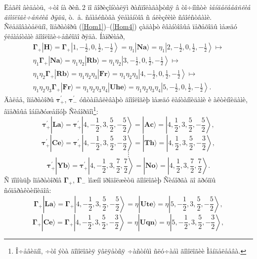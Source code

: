 Ëåãêî âèäåòü, ÷òî íà ðèñ.\,2 ïî ãîðèçîíòàëÿì ðàñïîëàãàþòñÿ â òî÷íîñòè \textit{ìåíäåëååâñêèå ãîìîëîãè÷åñêèå ðÿäû}, ò.~å. ñåìåéñòâà ýëåìåíòîâ ñ áëèçêèìè ñâîéñòâàìè. Ñëåäîâàòåëüíî, îïåðàòîðû (\ref{Hom1})--(\ref{Hom4}) çàäàþò êâàíòîâûå ïåðåõîäû ìåæäó ýëåìåíòàìè ãîìîëîãè÷åñêîãî ðÿäà. Íàïðèìåð,
\begin{multline}
\boldsymbol{\Gamma}_+|\textbf{H}\rangle=\boldsymbol{\Gamma}_+\left|1,-\frac{1}{2},0,\frac{1}{2},-\frac{1}{2}\right\rangle=
\eta_1|\textbf{Na}\rangle=\eta_1\left|2,-\frac{1}{2},0,\frac{1}{2},-\tfrac{1}{2}\right\rangle\longmapsto\\
\eta_1\boldsymbol{\Gamma}_+|\textbf{Na}\rangle=\eta_1\eta_2|\textbf{Rb}\rangle=\eta_1\eta_2
\left|3,-\frac{1}{2},0,\frac{1}{2},-\frac{1}{2}\right\rangle\longmapsto\\
\eta_1\eta_2\boldsymbol{\Gamma}_+|\textbf{Rb}\rangle=\eta_1\eta_2\eta_3|\textbf{Fr}\rangle=\eta_1\eta_2\eta_3
\left|4,-\frac{1}{2},0,\frac{1}{2},-\frac{1}{2}\right\rangle\longmapsto\\
\eta_1\eta_2\eta_3\boldsymbol{\Gamma}_+|\textbf{Fr}\rangle=\eta_1\eta_2\eta_3\eta_4|\textbf{Uhe}\rangle=\eta_1\eta_2\eta_3\eta_4
\left|5,-\frac{1}{2},0,\frac{1}{2},-\frac{1}{2}\right\rangle.\nonumber
\end{multline}
Äàëåå, îïåðàòîðû $\boldsymbol{\tau}^\prime_+$, $\boldsymbol{\tau}^\prime_-$ óñòàíàâëèâàþò ãîìîëîãèþ ìåæäó ëàíòàíîèäàìè è àêòèíîèäàìè, âïåðâûå îáíàðóæåííóþ Ñèáîðãîì\footnote{Î÷åâèäíî, ÷òî ýòà ãîìîëîãèÿ ÿâëÿåòñÿ ÷àñòíûì ñëó÷àåì ãîìîëîãèè Ìåíäåëååâà.}:
\[
\boldsymbol{\tau}^\prime_+|\textbf{La}\rangle=\boldsymbol{\tau}^\prime_+
\left|4,-\frac{1}{2},3,\frac{5}{2},-\frac{5}{2}\right\rangle=|\textbf{Ac}\rangle=
\left|4,\frac{1}{2},3,\frac{5}{2},-\frac{5}{2}\right\rangle,
\]
\[
\boldsymbol{\tau}^\prime_+|\textbf{Ce}\rangle=\boldsymbol{\tau}^\prime_+
\left|4,-\frac{1}{2},3,\frac{5}{2},-\frac{3}{2}\right\rangle=|\textbf{Th}\rangle=
\left|4,\frac{1}{2},3,\frac{5}{2},-\frac{3}{2}\right\rangle,
\]
\[
\vdots
\]
\[
\boldsymbol{\tau}^\prime_+|\textbf{Yb}\rangle=\boldsymbol{\tau}^\prime_+
\left|4,-\frac{1}{2},3,\frac{7}{2},\frac{7}{2}\right\rangle=|\textbf{No}\rangle=
\left|4,\frac{1}{2},3,\frac{7}{2},\frac{7}{2}\right\rangle.
\]
Ñ ïîìîùüþ îïåðàòîðîâ $\boldsymbol{\Gamma}_+$, $\boldsymbol{\Gamma}_-$ ìîæíî ïðîäîëæèòü ãîìîëîãèþ Ñèáîðãà äî ãðóïïû ñóïåðàêòèíîèäîâ:
\[
\boldsymbol{\Gamma}_+|\textbf{La}\rangle=\boldsymbol{\Gamma}_+\left|4,-\frac{1}{2},3,\frac{5}{2},-\frac{5}{2}\right\rangle=
\eta|\textbf{Ute}\rangle=\eta\left|5,-\frac{1}{2},3,\frac{5}{2},-\frac{5}{2}\right\rangle,
\]
\[
\boldsymbol{\Gamma}_+|\textbf{Ce}\rangle=\boldsymbol{\Gamma}_+\left|4,-\frac{1}{2},3,\frac{5}{2},-\frac{3}{2}\right\rangle=
\eta|\textbf{Uqn}\rangle=\eta\left|5,-\frac{1}{2},3,\frac{5}{2},-\frac{3}{2}\right\rangle,
\]
